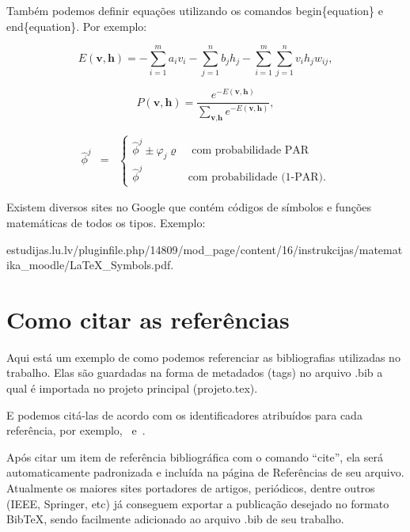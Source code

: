 Também podemos definir equações utilizando os comandos begin\{equation\} e end\{equation\}. Por exemplo:

\begin{equation}
\label{e.energy_rbm}
E(\textbf{v},\textbf{h})=-\sum_{i=1}^ma_iv_i-\sum_{j=1}^nb_jh_j-\sum_{i=1}^m\sum_{j=1}^nv_ih_jw_{ij},
\end{equation}

\begin{equation}
\label{e.probability_configuration}
P(\textbf{v},\textbf{h})=\frac{e^{-E(\textbf{v},\textbf{h})}}{\displaystyle\sum_{\textbf{v},\textbf{h}}e^{-E(\textbf{v},\textbf{h})}},
\end{equation}

\begin{eqnarray}
\label{eq:par}
\hat{\phi}^j & = & \left\{ \begin{array}{ll} \hat{\phi}^j\pm \varphi_j \varrho  & \mbox{{ com probabilidade PAR}} \\
    \hat{\phi}^j & \mbox{{com probabilidade (1-PAR).}}
\end{array}\right.
\end{eqnarray}

Existem diversos sites no Google que contém códigos de símbolos e funções matemáticas de todos os tipos. Exemplo:\\
\begin{center}
\tiny estudijas.lu.lv/pluginfile.php/14809/mod\_page/content/16/instrukcijas/matematika\_moodle/LaTeX\_Symbols.pdf.
\end{center}

\section{Como citar as referências}
\label{ss.referencias}

Aqui está um exemplo de como podemos referenciar as bibliografias utilizadas no trabalho. Elas são guardadas na forma de metadados (tags) no arquivo .bib a qual é importada no projeto principal (projeto.tex).

E podemos citá-las de acordo com os identificadores atribuídos para cada referência, por exemplo,~\cite{stonebraker93} e~\cite{rocha09}.

Após citar um item de referência bibliográfica com o comando ``cite'', ela será automaticamente padronizada e incluída na página de Referências de seu arquivo. Atualmente os maiores sites portadores de artigos, periódicos, dentre outros (IEEE, Springer, etc) já conseguem exportar a publicação desejado no formato BibTeX, sendo facilmente adicionado ao arquivo .bib de seu trabalho.

